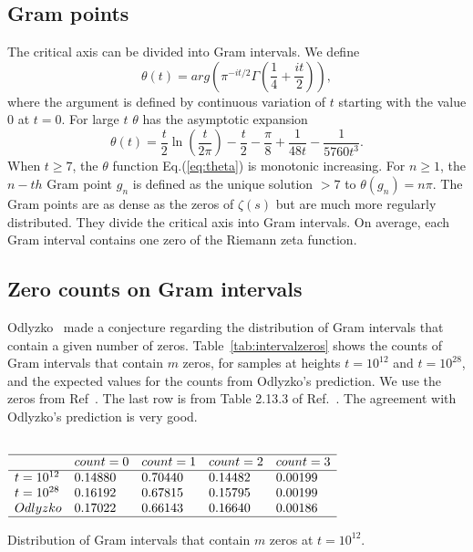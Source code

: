 \documentclass[journal]{IEEEtai}
\begin{document}
\subsection{Gram points}
The critical axis can be divided into Gram intervals. 
We define
\begin{equation}
\theta(t) = arg (\pi^{-it/2} \Gamma(\frac{1}{4} + \frac{it}{2})), 
\label{eq:theta}
\end{equation}
where the argument is defined by continuous variation of $t$ starting with the value $0$ at $t = 0$.
For large $t$ $\theta$ has the asymptotic expansion
\begin{equation}
\theta(t) = \frac{t}{2}\ln (\frac{t}{2\pi}) - \frac{t}{2} - \frac{\pi}{8} + \frac{1}{48t} - \frac{1}{5760t^3}. 
\label{eq:thetaAsymptotic}
\end{equation}
 When $t \ge 7$, the $\theta$ function Eq.(\ref{eq:theta}) is monotonic increasing. 
For $n \ge 1$, the $n-th$ Gram point $g_n$ is defined as the unique solution $> 7$ to
$\theta (g_n) = n\pi$.
The Gram points are as dense as the zeros of $\zeta(s)$ but are much more regularly distributed. They divide the critical axis into Gram intervals. On average, each Gram interval contains one zero of the Riemann zeta function.

\subsection{Zero counts on Gram intervals}
 Odlyzko~\cite{Odlyzko 1992} made a conjecture regarding the distribution of Gram intervals that contain a given number of zeros. 
Table~\ref{tab:intervalzeros} shows the counts of Gram intervals that contain $m$ zeros, for samples at heights  $t=10^{12}$ and $t=10^{28}$, and the  expected values for the counts from Odlyzko's prediction. We use the zeros from Ref~\cite{hiary 2010}. The last row is from Table 2.13.3 of Ref.~\cite{Odlyzko 1992}. The agreement with Odlyzko's prediction is very good. 


\begin{table}
\centering \(\begin{array}{lllll}\\
\hline
 &count = 0&count = 1&count = 2&count = 3\\
\hline
t = 10^{12}&0.14880&0.70440&0.14482&0.00199\\
t = 10^{28}&0.16192&0.67815&0.15795&0.00199\\
Odlyzko&0.17022&0.66143&0.16640&0.00186\\
\hline
\end{array}\)
\caption{Distribution of Gram intervals that contain $m$ zeros at  $t=10^{12}$.} 
\label{tab:intervalzeros}
\end{table}
\end{document}

